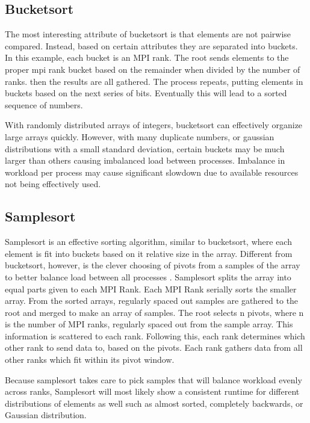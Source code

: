 \documentclass[10pt,letterpaper]{article}
\begin{document}
\begin{multicols}{2}
\subsection{Bucketsort}

The most interesting attribute of bucketsort is that elements are not pairwise compared. Instead, based on certain attributes they are separated into buckets. In this example, each bucket is an MPI rank. The root sends elements to the proper mpi rank bucket based on the remainder when divided by the number of ranks. then the results are all gathered. The process repeats, putting elements in buckets based on the next series of bits. Eventually this will lead to a sorted sequence of numbers.

With randomly distributed arrays of integers, bucketsort can effectively organize large arrays quickly. However, with many duplicate numbers, or gaussian distributions with a small standard deviation, certain buckets may be much larger than others causing imbalanced load between processes. Imbalance in workload per process may cause significant slowdown due to available resources not being effectively used.

\subsection{Samplesort}

Samplesort is an effective sorting algorithm, similar to bucketsort, where each element is fit into buckets based on it relative size in the array. Different from bucketsort, however, is the clever choosing of pivots from a samples of the array to better balance load between all processes
\cite{samplesort}. Samplesort splits the array into equal parts given to each MPI Rank. Each MPI Rank serially sorts the smaller array. From the sorted arrays, regularly spaced out samples are gathered to the root and merged to make an array of samples. The root selects n pivots, where n is the number of MPI ranks, regularly spaced out from the sample array. This information is scattered to each rank. Following this, each rank determines which other rank to send data to, based on the pivots. Each rank gathers data from all other ranks which fit within its pivot window. 

Because samplesort takes care to pick samples that will balance workload evenly across ranks, Samplesort will most likely show a consistent runtime for different distributions of elements as well such as almost sorted, completely backwards, or Gaussian distribution.


\end{multicols}
\end{document}
